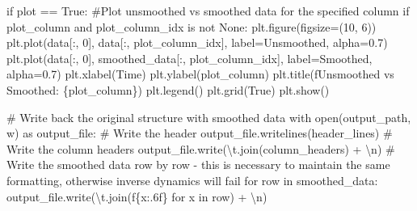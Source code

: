 \documentclass[
  letterpaper,
  DIV=11,
  numbers=noendperiod]{scrreprt}
\newenvironment{Shaded}{\begin{snugshade}}{\end{snugshade}}
\newcommand{\BuiltInTok}[1]{\textcolor[rgb]{0.00,0.23,0.31}{#1}}
\newcommand{\CharTok}[1]{\textcolor[rgb]{0.13,0.47,0.30}{#1}}
\newcommand{\CommentTok}[1]{\textcolor[rgb]{0.37,0.37,0.37}{#1}}
\newcommand{\ControlFlowTok}[1]{\textcolor[rgb]{0.00,0.23,0.31}{#1}}
\newcommand{\DecValTok}[1]{\textcolor[rgb]{0.68,0.00,0.00}{#1}}
\newcommand{\FloatTok}[1]{\textcolor[rgb]{0.68,0.00,0.00}{#1}}
\newcommand{\ImportTok}[1]{\textcolor[rgb]{0.00,0.46,0.62}{#1}}
\newcommand{\KeywordTok}[1]{\textcolor[rgb]{0.00,0.23,0.31}{#1}}
\newcommand{\NormalTok}[1]{\textcolor[rgb]{0.00,0.23,0.31}{#1}}
\newcommand{\OperatorTok}[1]{\textcolor[rgb]{0.37,0.37,0.37}{#1}}
\newcommand{\SpecialCharTok}[1]{\textcolor[rgb]{0.37,0.37,0.37}{#1}}
\newcommand{\SpecialStringTok}[1]{\textcolor[rgb]{0.13,0.47,0.30}{#1}}
\newcommand{\StringTok}[1]{\textcolor[rgb]{0.13,0.47,0.30}{#1}}
\newcommand{\VariableTok}[1]{\textcolor[rgb]{0.07,0.07,0.07}{#1}}
\begin{document}
\begin{Shaded}
\begin{Highlighting}[]
    \ControlFlowTok{if}\NormalTok{ plot }\OperatorTok{==} \VariableTok{True}\NormalTok{:}
        \CommentTok{\#Plot unsmoothed vs smoothed data for the specified column}
        \ControlFlowTok{if}\NormalTok{ plot\_column }\KeywordTok{and}\NormalTok{ plot\_column\_idx }\KeywordTok{is} \KeywordTok{not} \VariableTok{None}\NormalTok{:}
\NormalTok{            plt.figure(figsize}\OperatorTok{=}\NormalTok{(}\DecValTok{10}\NormalTok{, }\DecValTok{6}\NormalTok{))}
\NormalTok{            plt.plot(data[:, }\DecValTok{0}\NormalTok{], data[:, plot\_column\_idx], label}\OperatorTok{=}\StringTok{\textquotesingle{}Unsmoothed\textquotesingle{}}\NormalTok{, alpha}\OperatorTok{=}\FloatTok{0.7}\NormalTok{)}
\NormalTok{            plt.plot(data[:, }\DecValTok{0}\NormalTok{], smoothed\_data[:, plot\_column\_idx], label}\OperatorTok{=}\StringTok{\textquotesingle{}Smoothed\textquotesingle{}}\NormalTok{, alpha}\OperatorTok{=}\FloatTok{0.7}\NormalTok{)}
\NormalTok{            plt.xlabel(}\StringTok{\textquotesingle{}Time\textquotesingle{}}\NormalTok{)}
\NormalTok{            plt.ylabel(plot\_column)}
\NormalTok{            plt.title(}\SpecialStringTok{f\textquotesingle{}Unsmoothed vs Smoothed: }\SpecialCharTok{\{}\NormalTok{plot\_column}\SpecialCharTok{\}}\SpecialStringTok{\textquotesingle{}}\NormalTok{)}
\NormalTok{            plt.legend()}
\NormalTok{            plt.grid(}\VariableTok{True}\NormalTok{)}
\NormalTok{            plt.show()}

    \CommentTok{\# Write back the original structure with smoothed data}
    \ControlFlowTok{with} \BuiltInTok{open}\NormalTok{(output\_path, }\StringTok{\textquotesingle{}w\textquotesingle{}}\NormalTok{) }\ImportTok{as}\NormalTok{ output\_file:}
        \CommentTok{\# Write the header}
\NormalTok{        output\_file.writelines(header\_lines)}
        \CommentTok{\# Write the column headers}
\NormalTok{        output\_file.write(}\StringTok{\textquotesingle{}}\CharTok{\textbackslash{}t}\StringTok{\textquotesingle{}}\NormalTok{.join(column\_headers) }\OperatorTok{+} \StringTok{\textquotesingle{}}\CharTok{\textbackslash{}n}\StringTok{\textquotesingle{}}\NormalTok{)}
        \CommentTok{\# Write the smoothed data row by row {-} this is necessary to maintain the same formatting, otherwise inverse dynamics will fail}
        \ControlFlowTok{for}\NormalTok{ row }\KeywordTok{in}\NormalTok{ smoothed\_data:}
\NormalTok{            output\_file.write(}\StringTok{\textquotesingle{}}\CharTok{\textbackslash{}t}\StringTok{\textquotesingle{}}\NormalTok{.join(}\SpecialStringTok{f\textquotesingle{}}\SpecialCharTok{\{}\NormalTok{x}\SpecialCharTok{:.6f\}}\SpecialStringTok{\textquotesingle{}} \ControlFlowTok{for}\NormalTok{ x }\KeywordTok{in}\NormalTok{ row) }\OperatorTok{+} \StringTok{\textquotesingle{}}\CharTok{\textbackslash{}n}\StringTok{\textquotesingle{}}\NormalTok{)}
\end{Highlighting}
\end{Shaded}
\end{document}

